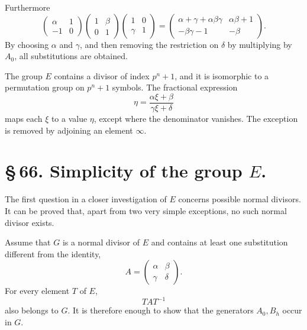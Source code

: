 \documentclass[11pt]{article}
\begin{document}
Furthermore
\begin{equation}
 \begin{pmatrix}\alpha&1\\-1&0\end{pmatrix}
 \begin{pmatrix}1&\beta\\0&1\end{pmatrix}
 \begin{pmatrix}1&0\\\gamma&1\end{pmatrix}
 =
 \begin{pmatrix}\alpha+\gamma+\alpha\beta\gamma&\alpha\beta+1\\
 -\beta\gamma-1&-\beta
 \end{pmatrix}. \tag{11}
\end{equation}
By choosing $\alpha$ and $\gamma$, and then removing the restriction on $\delta$ by multiplying by $A_0$, all substitutions are obtained.

The group $E$ contains a divisor of index $p^n+1$, and it is isomorphic to a permutation group on $p^n+1$ symbols. The fractional expression
\begin{equation}
 \eta=\frac{\alpha\xi+\beta}{\gamma\xi+\delta} \tag{12}
\end{equation}
maps each $\xi$ to a value $\eta$, except where the denominator vanishes. The exception is removed by adjoining an element $\infty$.

\section*{\S\,66. Simplicity of the group $E$.}

The first question in a closer investigation of $E$ concerns possible normal divisors. It can be proved that, apart from two very simple exceptions, no such normal divisor exists.

Assume that $G$ is a normal divisor of $E$ and contains at least one substitution different from the identity,
\begin{equation}
 A=\begin{pmatrix}\alpha&\beta\\\gamma&\delta\end{pmatrix}. \tag{1}
\end{equation}
For every element $T$ of $E$,
\begin{equation}
 TAT^{-1} \tag{2}
\end{equation}
also belongs to $G$. It is therefore enough to show that the generators $A_0,B_h$ occur in $G$.
\end{document}
